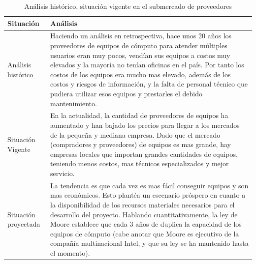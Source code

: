 \documentclass[a4paper, 12pt, oneside]{article}
\begin{document}
	\begin{table}
		\caption{Análisis histórico, situación vigente en el submercado de proveedores}
		\begin{tabular}{ | p{4cm} | p{10cm} | }
		\hline
		Situación & Análisis \\
		\hline					
		Análisis histórico & 
		Haciendo un análisis en retrospectiva, hace unos 20 años los proveedores de equipos de cómputo para atender múltiples usuarios eran muy pocos, vendían sus equipos a costos muy elevados y la mayoría no tenían oficinas en el país. Por tanto los costos de los equipos era mucho mas elevado, además de los costos y riesgos de información, y la falta de personal técnico que pudiera utilizar esos equipos y prestarles el debido mantenimiento. \\
		\hline
		Situación Vigente &
		En la actualidad, la cantidad de proveedores de equipos ha aumentado y han bajado los precios para llegar a los mercados de la pequeña y mediana empresa. Dado que el mercado (compradores y proveedores) de equipos es mas grande, hay empresas locales que importan grandes cantidades de equipos, teniendo menos costos, mas técnicos especializados y mejor servicio. \\
		\hline
		Situación proyectada &
		La tendencia es que cada vez es mas fácil conseguir equipos y son mas económicos. Esto plantéa un escenario próspero en cuanto a la disponibilidad de los recursos materiales necesarios para el desarrollo del proyecto. Hablando cuantitativamente, la ley de Moore establece que cada 3 años de duplica la capacidad de los equipos de cómputo (cabe anotar que Moore es ejecutivo de la compañía multinacional Intel, y que su ley se ha mantenido hasta el momento). \\
		\hline
		\end{tabular}
		\label{provHistorico}
	\end{table}
	
\end{document}
